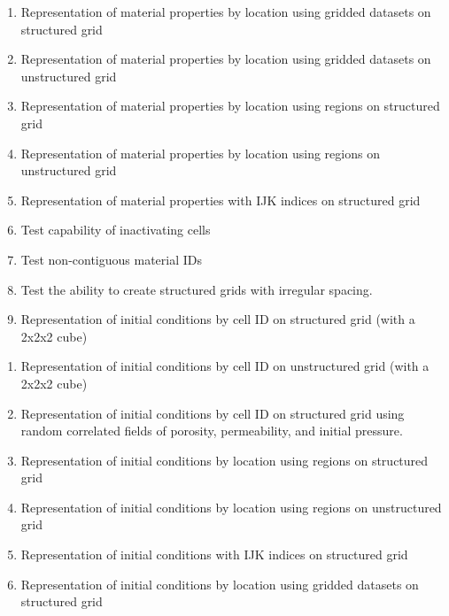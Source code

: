 \begin{enumerate}[label=Test \alph*.,ref=Test \alph*,nosep]
	\item \label{testRepMatGridStruc} Representation of material properties by location using gridded datasets on structured grid
	\item \label{testRepMatGridUnstruc} Representation of material properties by location using gridded datasets on unstructured grid
	\item \label{testRepMatRegStruc} Representation of material properties by location using regions on structured grid
	\item \label{testRepMatRegUnstruc} Representation of material properties by location using regions on unstructured grid
	\item \label{testRepMatIJKStruc} Representation of material properties with IJK indices on structured grid
	\item \label{testInactive} Test capability of inactivating cells
	\item \label{testNonContMaterialIDS} Test non-contiguous material IDs
	\item \label{testStructIrregGrid} Test the ability to create structured grids with irregular spacing.
	\item \label{testRepICCellIDStruc} Representation of initial conditions by cell ID on structured grid (with a 2x2x2 cube)
\end{enumerate}

\begin{enumerate}[label=Test \greek*.,ref=Test \greek*,nosep]
\item \label{testRepICCellIDUnstruc} Representation of initial conditions by cell ID on unstructured grid (with a 2x2x2 cube)
\item \label{testRepICCellIDStruc16} Representation of initial conditions by cell ID on structured grid using random correlated fields of porosity, permeability, and initial pressure.
\item \label{testRepICRegStruc} Representation of initial conditions by location using regions on structured grid
\item \label{testRepICRegUnstruc} Representation of initial conditions by location using regions on unstructured grid
\item \label{testRepICIJKStruc} Representation of initial conditions with IJK indices on structured grid
\item \label{testRepICGridStruc} Representation of initial conditions by location using gridded datasets on structured grid
\end{enumerate}

